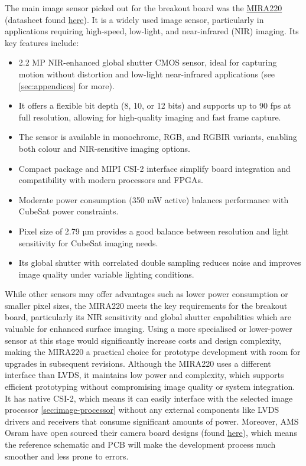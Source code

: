 The main image sensor picked out for the breakout board was the \href{https://ams-osram.com/products/sensor-solutions/cmos-image-sensors/ams-mira220}{MIRA220} (datasheet found \href{https://look.ams-osram.com/m/7591efdbe4af32dc/original/Mira220-1-2-7-2-2-MP-NIR-enhanced-global-shutter-image-sensor.pdf}{here}).
It is a widely used image sensor, particularly in applications requiring high-speed, low-light, and near-infrared (NIR) imaging. Its key features include:
\begin{itemize}
\item 2.2 MP NIR-enhanced global shutter CMOS sensor, ideal for capturing motion without distortion and low-light near-infrared applications (see \autoref{sec:appendices} for more).
\item It offers a flexible bit depth (8, 10, or 12 bits) and supports up to 90 fps at full resolution, allowing for high-quality imaging and fast frame capture.
\item The sensor is available in monochrome, RGB, and RGBIR variants, enabling both colour and NIR-sensitive imaging options.
\item Compact package and MIPI CSI-2 interface simplify board integration and compatibility with modern processors and FPGAs.
\item Moderate power consumption (350 mW active) balances performance with CubeSat power constraints.
\item Pixel size of 2.79 µm provides a good balance between resolution and light sensitivity for CubeSat imaging needs.
\item Its global shutter with correlated double sampling reduces noise and improves image quality under variable lighting conditions.
\end{itemize}
While other sensors may offer advantages such as lower power consumption or smaller pixel sizes, the MIRA220 meets the key requirements for the breakout board, particularly its NIR sensitivity and global shutter capabilities which are valuable for enhanced surface imaging.
Using a more specialised or lower-power sensor at this stage would significantly increase costs and design complexity, making the MIRA220 a practical choice for prototype development with room for upgrades in subsequent revisions.
\nl
Although the MIRA220 uses a different interface than LVDS, it maintains low power and complexity, which supports efficient prototyping without compromising image quality or system integration.
It has native CSI-2, which means it can easily interface with the selected image processor \autoref{sec:image-processor} without any external components like LVDS drivers and receivers that consume significant amounts of power. Moreover, AMS Osram have open sourced their camera board designs (found \href{https://github.com/ams-OSRAM/MIRA_camera_rpi/tree/main}{here}), which means the reference schematic and PCB will make the development process much smoother and less prone to errors.
